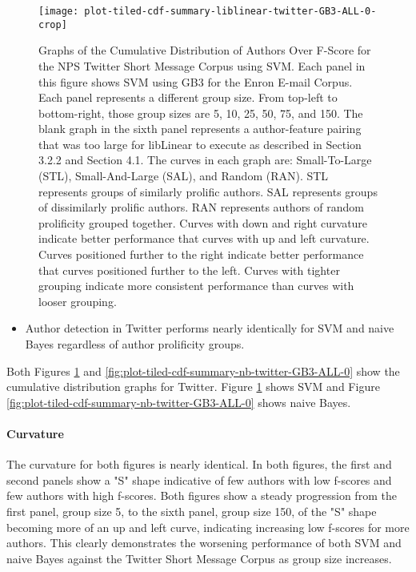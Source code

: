 	\begin{figure}[htbp!]
		\begin{center}
		\centering
		\texttt{[image: plot-tiled-cdf-summary-liblinear-twitter-GB3-ALL-0-crop]}
		\caption{Graphs of the Cumulative Distribution of Authors Over F-Score for the NPS Twitter Short Message Corpus using SVM. Each panel in this figure shows SVM using GB3 for the Enron E-mail Corpus.  Each panel represents a different group size.  From top-left to bottom-right, those group sizes are 5, 10, 25, 50, 75, and 150.   The blank graph in the sixth panel represents a author-feature pairing that was too large for libLinear to execute as described in Section 3.2.2 and Section 4.1.  The curves in each graph are: Small-To-Large (STL), Small-And-Large (SAL), and Random (RAN).  STL represents groups of similarly prolific authors.  SAL represents groups of dissimilarly prolific authors.  RAN represents authors of random prolificity grouped together.  Curves with down and right curvature indicate better performance that curves with up and left curvature.  Curves positioned further to the right indicate better performance that curves positioned further to the left.  Curves with tighter grouping indicate more consistent performance than curves with looser grouping.}
		\label{fig:plot-tiled-cdf-summary-liblinear-twitter-GB3-ALL-0}
		\end{center}
	\end{figure}
\begin{itemize}
	\item Author detection in Twitter performs nearly identically for SVM and naive Bayes regardless of author prolificity groups.
\end{itemize} 

 Both Figures \ref{fig:plot-tiled-cdf-summary-liblinear-twitter-GB3-ALL-0} and \ref{fig:plot-tiled-cdf-summary-nb-twitter-GB3-ALL-0} show the cumulative distribution graphs for Twitter.  Figure \ref{fig:plot-tiled-cdf-summary-liblinear-twitter-GB3-ALL-0} shows SVM and Figure \ref{fig:plot-tiled-cdf-summary-nb-twitter-GB3-ALL-0} shows naive Bayes.  
 \paragraph*{Curvature} The curvature for both figures is nearly identical.  In both figures, the first and second panels show a "S" shape indicative of few authors with low f-scores and few authors with high f-scores.  Both figures show a steady progression from the first panel, group size 5, to the sixth panel, group size 150, of the "S" shape becoming more of an up and left curve, indicating increasing low f-scores for more authors.  This clearly demonstrates the worsening performance of both SVM and naive Bayes against the Twitter Short Message Corpus as group size increases.
